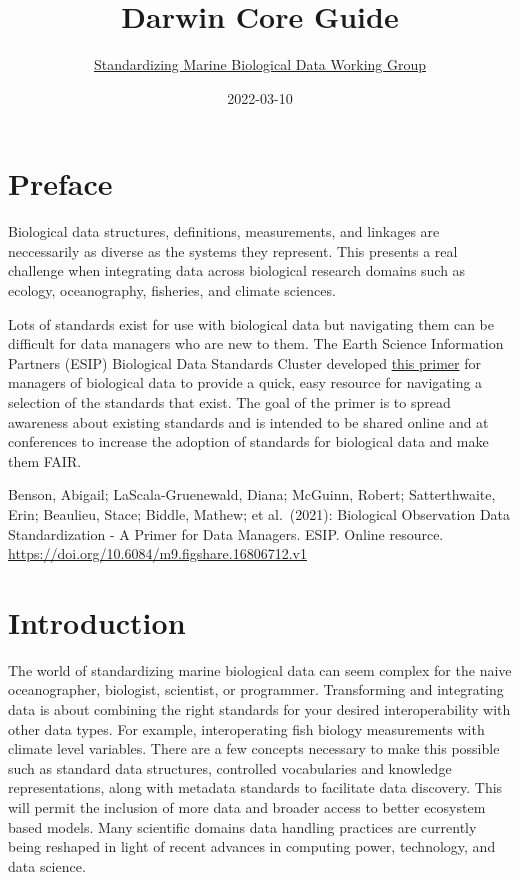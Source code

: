 \documentclass[
]{book}
\title{Darwin Core Guide}
\author{\href{https://github.com/ioos/bio_data_guide/graphs/contributors}{Standardizing Marine Biological Data Working Group}}
\date{2022-03-10}
\begin{document}
\maketitle

{
\setcounter{tocdepth}{1}
\tableofcontents
}
\hypertarget{preface}{%
\chapter*{Preface}\label{preface}}

Biological data structures, definitions, measurements, and linkages are neccessarily as diverse as the systems they represent. This presents a real challenge when integrating data across biological research domains such as ecology, oceanography, fisheries, and climate sciences.

Lots of standards exist for use with biological data but navigating them can be difficult for data managers who are new to them. The Earth Science Information Partners (ESIP) Biological Data Standards Cluster developed \href{https://doi.org/10.6084/m9.figshare.16806712.v1}{this primer} for managers of biological data to provide a quick, easy resource for navigating a selection of the standards that exist. The goal of the primer is to spread awareness about existing standards and is intended to be shared online and at conferences to increase the adoption of standards for biological data and make them FAIR.

Benson, Abigail; LaScala-Gruenewald, Diana; McGuinn, Robert; Satterthwaite, Erin; Beaulieu, Stace; Biddle, Mathew; et al.~(2021): Biological Observation Data Standardization - A Primer for Data Managers. ESIP. Online resource. \url{https://doi.org/10.6084/m9.figshare.16806712.v1}

\hypertarget{intro}{%
\chapter{Introduction}\label{intro}}

The world of standardizing marine biological data can seem complex for the naive oceanographer, biologist, scientist, or programmer.
Transforming and integrating data is about combining the right standards for your desired interoperability with other data types.
For example, interoperating fish biology measurements with climate level variables.
There are a few concepts necessary to make this possible such as standard data structures, controlled vocabularies and knowledge representations, along with metadata standards to facilitate data discovery. This will permit the inclusion of more data and broader access to better ecosystem based models. Many scientific domains data handling practices are currently being reshaped in light of recent advances in computing power, technology, and data science.
\end{document}
